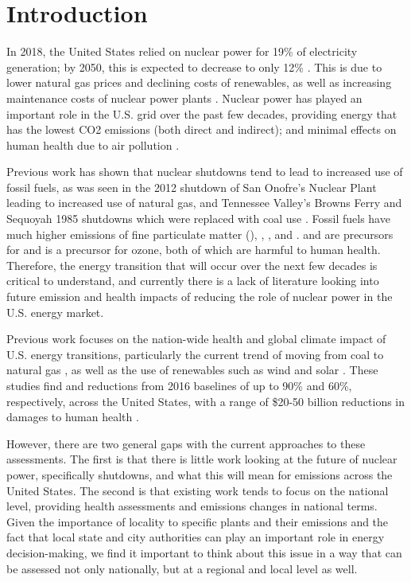 \documentclass[12]{article}
\begin{document}
\section{Introduction}
In 2018, the United States relied on nuclear power for 19\% of electricity generation; by 2050, this is expected to decrease to only 12\% \citep{eia_annual_2020}. This is due to lower natural gas prices and declining costs of renewables, as well as increasing maintenance costs of nuclear power plants \citep{davis_market_2016}. Nuclear power has played an important role in the U.S. grid over the past few decades, providing energy that has the lowest CO2 emissions (both direct and indirect); and minimal effects on human health due to air pollution \citep{markandya_electricity_2007}. 

Previous work has shown that nuclear shutdowns tend to lead to increased use of fossil fuels, as was seen in the 2012 shutdown of San Onofre’s Nuclear Plant leading to increased use of natural gas, and Tennessee Valley’s Browns Ferry and Sequoyah 1985 shutdowns which were replaced with coal use \citep{davis_market_2016,severnini_impacts_2017}. Fossil fuels have much higher emissions of fine particulate matter (), , , and .  and  are precursors for  and  is a precursor for ozone, both of which are harmful to human health. Therefore, the energy transition that will occur over the next few decades is critical to understand, and currently there is a lack of literature looking into future emission and health impacts of reducing the role of nuclear power in the U.S. energy market. 

Previous work focuses on the nation-wide health and global climate impact of U.S. energy transitions, particularly the current trend of moving from coal to natural gas \citep{lueken_climate_2016, zhang_climate_2016}, as well as the use of renewables such as wind and solar \citep{millstein_climate_2017}. These studies find  and  reductions from 2016 baselines of up to 90\% and 60\%, respectively, across the United States, with a range of \$20-50 billion reductions in damages to human health \citep{lueken_climate_2016}. 

However, there are two general gaps with the current approaches to these assessments. The first is that there is little work looking at the future of nuclear power, specifically shutdowns, and what this will mean for emissions across the United States. The second is that existing work tends to focus on the national level, providing health assessments and emissions changes in national terms. Given the importance of locality to specific plants and their emissions and the fact that local state and city authorities can play an important role in energy decision-making, we find it important to think about this issue in a way that can be assessed not only nationally, but at a regional and local level as well. 
\end{document}
